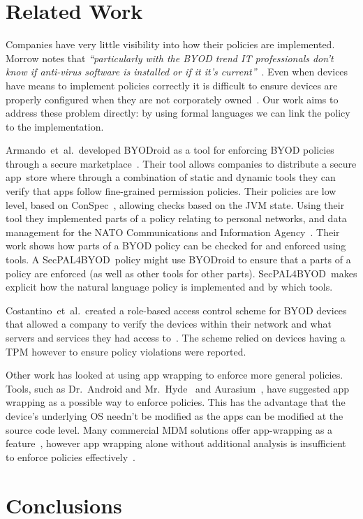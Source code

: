 \documentclass{llncs}
\makeatletter
\newcommand{\etal}{et~al.\@}
\newcommand{\AppPAL}[0]{SecPAL4BYOD}
\makeatother
\begin{document}
\section{Related Work}
\label{sec:related}

Companies have very little visibility into how their policies are implemented.
Morrow notes that \emph{``particularly with the BYOD trend IT professionals don't know if anti-virus software is installed or if it it's current''}~\cite{morrow_byod_2012}.
Even when devices have means to implement policies correctly it is difficult to ensure devices are properly configured when they are not corporately owned~\cite{tokuyoshi_security_2013}.
Our work aims to address these problem directly: by using formal languages we can link the policy to the implementation.

Armando~\etal~developed BYODroid as a tool for enforcing BYOD policies through a secure marketplace~\cite{armando_enabling_2014}.
Their tool allows companies to distribute a secure app~store where through a combination of static and dynamic tools they can verify that apps follow fine-grained permission policies.
Their policies are low level, based on ConSpec~\cite{aktug_conspec_2008}, allowing checks based on the JVM state.
Using their tool they implemented parts of a policy relating to personal networks, and data management for the NATO Communications and Information Agency~\cite{armando_developing_2016}.
Their work shows how parts of a BYOD policy can be checked for and enforced using tools.
A \AppPAL~policy might use BYODroid to ensure that a parts of a policy are enforced (as well as other tools for other parts).
\AppPAL~makes explicit how the natural language policy is implemented and by which tools.

Costantino~\etal~created a role-based access control scheme for BYOD devices that allowed a company to verify the devices within their network and what servers and services they had access to~\cite{costantino_towards_2013}. The scheme relied on devices having a TPM however to ensure policy violations were reported.

Other work has looked at using app wrapping to enforce more general policies.
Tools, such as Dr.~Android and Mr.~Hyde~\cite{jeon_dr._2012} and Aurasium~\cite{xu_aurasium:_2012}, have suggested app wrapping as a possible way to enforce policies.
This has the advantage that the device's underlying OS needn't be modified as the apps can be modified at the source code level.
Many commercial \ac{MDM} solutions offer app-wrapping as a feature~\cite{_ibm_????,_app_????}, however app wrapping alone without additional analysis is insufficient to enforce policies effectively~\cite{hao_effectiveness_2013}.



\section{Conclusions}
\label{sec:conclusions}



{}

\end{document}

